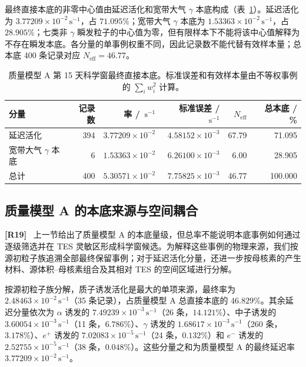 \documentclass[11pt]{article}
\newcommand{\revmark}[1]{\textcolor{revisionblue}{\textbf{[R#1]}}\ }
\newcommand{\revblue}[1]{\textcolor{revisionblue}{#1}}
\newcommand{\cps}{\,\mathrm{s^{-1}}}
\begin{document}
最终直接本底的非零中心值由延迟活化和宽带大气 $\gamma$ 本底构成（表~\ref{tab:reference_background_budget_zh}）。延迟活化为 $3.77209\times10^{-2}\cps$，占 $71.095\%$；宽带大气 $\gamma$ 本底为 $1.53363\times10^{-2}\cps$，占 $28.905\%$；\revblue{七类非 $\gamma$ 瞬发粒子}的中心值为零，但有限样本下不能将该中心值解释为不存在瞬发本底。各分量的单事例权重不同，因此记录数不能代替有效样本量；总本底 400 条记录对应 $N_{\mathrm{eff}}=46.77$。

\begin{table}[H]
\centering
\caption{质量模型 A 第 15 天科学窗最终直接本底。标准误差和有效样本量由不等权事例的 $\sum_i w_i^2$ 计算。}
\label{tab:reference_background_budget_zh}
\footnotesize
\begin{tabular}{lrrrrr}
\toprule
分量 & 记录数 & 率 / $\cps$ & 标准误差 / $\cps$ & $N_{\mathrm{eff}}$ & 总本底 / \% \\
\midrule
延迟活化 & 394 & $3.77209\times10^{-2}$ & $4.58152\times10^{-3}$ & 67.79 & 71.095 \\
宽带大气 $\gamma$ 本底 & 6 & $1.53363\times10^{-2}$ & $6.26100\times10^{-3}$ & 6.00 & 28.905 \\
\midrule
总计 & 400 & $5.30571\times10^{-2}$ & $7.75825\times10^{-3}$ & 46.77 & 100.000 \\
\bottomrule
\end{tabular}
\end{table}

\subsection{质量模型 A 的本底来源与空间耦合}
\label{subsec:mass_model_a_origins_zh}

\revmark{19}
\begingroup
\color{revisionblue}
上一节给出了质量模型 A 的本底量级，但总率不能说明本底事例如何通过逐级筛选并在 TES 灵敏区形成科学窗候选。为解释这些事例的物理来源，我们按源初粒子族追溯全部最终保留事例；对于延迟活化分量，还进一步按母核素的产生材料、源体积--母核素组合及其相对 TES 的空间区域进行分解。

按源初粒子族分解，质子诱发活化是最大的单项来源，最终率为 $2.48463\times10^{-2}\cps$（35 条记录），占质量模型 A 总直接本底的 $46.829\%$。其余延迟分量依次为 $\alpha$ 诱发的 $7.49239\times10^{-3}\cps$（26 条，$14.121\%$）、中子诱发的 $3.60054\times10^{-3}\cps$（11 条，$6.786\%$）、$\gamma$ 诱发的 $1.68617\times10^{-3}\cps$（260 条，$3.178\%$）、$e^+$ 诱发的 $7.02083\times10^{-5}\cps$（24 条，$0.132\%$）和 $e^-$ 诱发的 $2.52755\times10^{-5}\cps$（38 条，$0.048\%$）。这些分量之和为质量模型 A 的最终延迟率 $3.77209\times10^{-2}\cps$。
\end{document}

